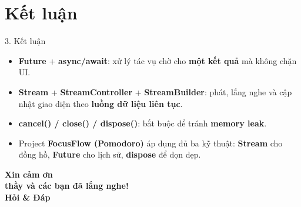 \documentclass[aspectratio=169,10pt]{beamer}
\begin{document}
\section{Kết luận}

\begin{frame}{3. Kết luận}
  \small
  \begin{itemize}\itemsep5pt
    \item \textbf{Future} + \textbf{async/await}: xử lý tác vụ chờ cho \textbf{một kết quả} mà không chặn UI.
    \item \textbf{Stream} + \textbf{StreamController} + \textbf{StreamBuilder}: phát, lắng nghe và cập nhật giao diện theo \textbf{luồng dữ liệu liên tục}.
    \item \textbf{cancel() / close() / dispose()}: bắt buộc để tránh \textbf{memory leak}.
    \item Project \textbf{FocusFlow (Pomodoro)} áp dụng đủ ba kỹ thuật: \textbf{Stream} cho đồng hồ, \textbf{Future} cho lịch sử, \textbf{dispose} để dọn dẹp.
  \end{itemize}
\end{frame}

\begin{frame}[plain]
  \centering
  \vspace{1.6cm}
  \vspace{16pt}
  {\Huge\bfseries Xin cảm ơn\\[6pt] thầy và các bạn đã lắng nghe!}\\[16pt]
  {\Large\bfseries Hỏi \& Đáp}
\end{frame}
\end{document}
